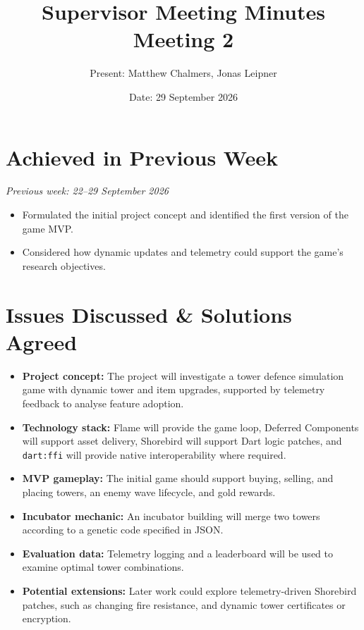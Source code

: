 \documentclass[12pt,a4paper]{article}
\title{\textbf{Supervisor Meeting Minutes}\\Meeting 2}
\author{Present: Matthew Chalmers, Jonas Leipner}
\date{Date: 29 September 2026}
\begin{document}
\maketitle

\section{Achieved in Previous Week}

\noindent\textit{Previous week: 22--29 September 2026}
\begin{itemize}[leftmargin=*]
    \item Formulated the initial project concept and identified the first version of the game MVP.
    \item Considered how dynamic updates and telemetry could support the game's research objectives.
\end{itemize}

\section{Issues Discussed \& Solutions Agreed}

\begin{itemize}[leftmargin=*]
    \item \textbf{Project concept:} The project will investigate a tower defence simulation game with dynamic tower and item upgrades, supported by telemetry feedback to analyse feature adoption.
    \item \textbf{Technology stack:} Flame will provide the game loop, Deferred Components will support asset delivery, Shorebird will support Dart logic patches, and \texttt{dart:ffi} will provide native interoperability where required.
    \item \textbf{MVP gameplay:} The initial game should support buying, selling, and placing towers, an enemy wave lifecycle, and gold rewards.
    \item \textbf{Incubator mechanic:} An incubator building will merge two towers according to a genetic code specified in JSON.
    \item \textbf{Evaluation data:} Telemetry logging and a leaderboard will be used to examine optimal tower combinations.
    \item \textbf{Potential extensions:} Later work could explore telemetry-driven Shorebird patches, such as changing fire resistance, and dynamic tower certificates or encryption.
\end{itemize}
\end{document}
